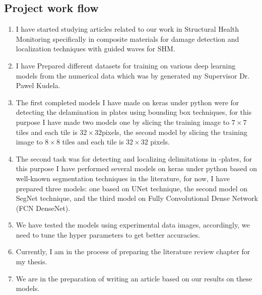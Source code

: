 \documentclass[11pt,a4paper]{report}
\begin{document}
\subsection{Project work flow}
\begin{enumerate}
\item  I have started studying articles related to our work in Structural Health Monitoring specifically in composite materials for damage detection and localization techniques with guided waves for SHM.  

\item I have Prepared different datasets for training on various deep learning models from  the numerical data which was by generated my Supervisor Dr. Pawel Kudela.

\item The first completed models I have made on keras under python were for detecting the delamination in plates using bounding box techniques, for this purpose I have made two models one by slicing the training image to \(7\times7\) tiles and each tile is \(32\times32\)pixels, the second model by slicing the training image to \(8\times8\) tiles and each tile is \(32\times32\) pixels.
\item The second task was for detecting and localizing delimitations in -plates, for this purpose I have performed several models on keras under python based on well-known segmentation techniques in the literature, for now, I have prepared three models: one based on UNet technique, the second model on SegNet technique, and the third model on Fully Convolutional Dense Network (FCN DenseNet).
\item We have tested the models using experimental data images, accordingly, we need to tune the hyper parameters to get better accuracies.
\item Currently, I  am in the process of preparing the literature review chapter for my thesis.
\item We are in the preparation of writing an article based on our results on these models.
\end{enumerate}
\end{document}
